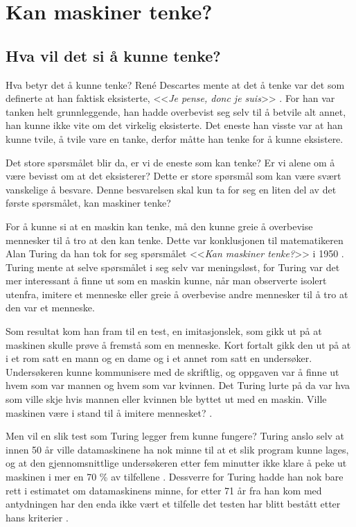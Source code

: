 \section{Kan maskiner tenke?}

\subsection{Hva vil det si å kunne tenke?}

Hva betyr det å kunne tenke?
René Descartes mente at det å tenke var det som definerte at han faktisk eksisterte, <<\textit{Je pense, donc je suis}>> \autocite[30]{Descartes1637}.
For han var tanken helt grunnleggende, 
han hadde overbevist seg selv til å betvile alt annet, han kunne ikke vite om det virkelig eksisterte. 
Det eneste han visste var at han kunne tvile, å tvile vare en tanke, derfor måtte han tenke for å kunne eksistere.

Det store spørsmålet blir da, er vi de eneste som kan tenke? 
Er vi alene om å være bevisst om at det eksisterer? 
Dette er store spørsmål som kan være svært vanskelige å besvare. 
Denne besvarelsen skal kun ta for seg en liten del av det første spørsmålet, 
kan maskiner tenke?

For å kunne si at en maskin kan tenke, må den kunne greie å overbevise mennesker til å tro at den kan tenke. Dette var konklusjonen til matematikeren Alan Turing da han tok for seg spørsmålet <<\textit{Kan maskiner tenke?}>> i 1950 \autocite{Kiran2013}. 
Turing mente at selve spørsmålet i seg selv var meningsløst, for Turing var det mer interessant å finne ut som en maskin kunne, når man observerte isolert utenfra, imitere et menneske eller greie å overbevise andre mennesker til å tro at den var et menneske.

Som resultat kom han fram til en test, en imitasjonslek, som gikk ut på at maskinen skulle prøve å fremstå som en menneske.
Kort fortalt gikk den ut på at i et rom satt en mann og en dame og i et annet rom satt en undersøker. 
Undersøkeren kunne kommunisere med de skriftlig, og oppgaven var å finne ut hvem som var mannen og hvem som var kvinnen.
Det Turing lurte på da var hva som ville skje hvis mannen eller kvinnen ble byttet ut med en maskin. 
Ville maskinen være i stand til å imitere mennesket?
\autocite[433-434]{Turing1950}.

Men vil en slik test som Turing legger frem kunne fungere? Turing anslo selv at innen 50 år ville datamaskinene ha nok minne til at et slik program kunne lages,
og at den gjennomsnittlige undersøkeren etter fem minutter ikke klare å peke ut maskinen i mer en 70 \% av tilfellene \autocite[442]{Turing1950}. 
Dessverre for Turing hadde han nok bare rett i estimatet om datamaskinens minne, for etter 71 år fra han kom med antydningen har den enda ikke vært et tilfelle det testen har blitt bestått etter hans kriterier \autocites[5]{Kiran2013}[]{turingTest}.


